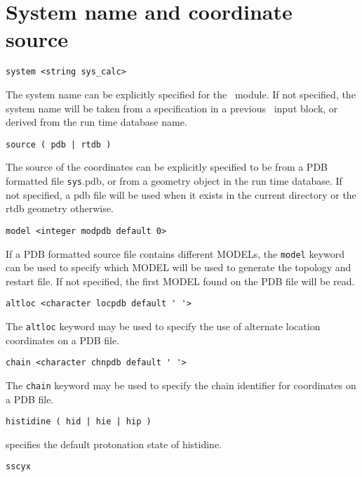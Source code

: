 \section{System name and coordinate source}

\begin{verbatim}
system <string sys_calc>
\end{verbatim}

The system name can be explicitly specified for the \prepare\ module.
If not specified, the system name will be taken from a specification
in a previous \md\ input block, or derived from the run time database
name.

\begin{verbatim}
source ( pdb | rtdb )
\end{verbatim}

The source of the coordinates can be explicitly specified to be from
a PDB formatted file \verb+sys+.pdb, or from a geometry object in the run
time database. If not specified, a pdb file will be used when it exists
in the current directory or the rtdb geometry otherwise.

\begin{verbatim}
model <integer modpdb default 0>
\end{verbatim}

If a PDB formatted source file contains different MODELs, the \verb+model+
keyword can be used to specify which MODEL will be used to generate the
topology and restart file. If not specified, the first MODEL found on the
PDB file will be read.

\begin{verbatim}
altloc <character locpdb default ' '>
\end{verbatim}

The \verb+altloc+ keyword may be used to specify the use of alternate
location coordinates on a PDB file.

\begin{verbatim}
chain <character chnpdb default ' '>
\end{verbatim}

The \verb+chain+ keyword may be used to specify the chain identifier
for coordinates on a PDB file.

\begin{verbatim}
histidine ( hid | hie | hip )
\end{verbatim}
specifies the default protonation state of histidine.

\begin{verbatim}
sscyx
\end{verbatim}

